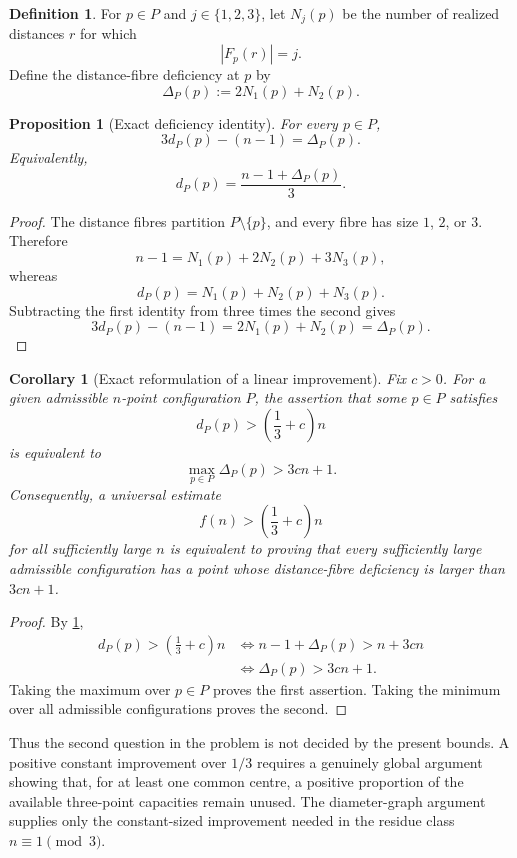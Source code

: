 \documentclass[11pt]{article}
\newtheorem{proposition}[proposition]{Proposition}
\newtheorem{corollary}[corollary]{Corollary}
\theoremstyle{definition}
\newtheorem{definition}[definition]{Definition}
\theoremstyle{remark}
\begin{document}
\begin{definition}
For $p\in P$ and $j\in\{1,2,3\}$, let $N_j(p)$ be the number of realized distances $r$ for which
\[
 |F_p(r)|=j.
\]
Define the distance-fibre deficiency at $p$ by
\[
 \Delta_P(p):=2N_1(p)+N_2(p).
\]
\end{definition}

\begin{proposition}[Exact deficiency identity]\label{prop:deficiency}
For every $p\in P$,
\[
 \boxed{
 3d_P(p)-(n-1)=\Delta_P(p).}
\]
Equivalently,
\[
 d_P(p)=\frac{n-1+\Delta_P(p)}{3}.
\]
\end{proposition}

\begin{proof}
The distance fibres partition $P\setminus\{p\}$, and every fibre has size $1$, $2$, or $3$.  Therefore
\[
 n-1=N_1(p)+2N_2(p)+3N_3(p),
\]
whereas
\[
 d_P(p)=N_1(p)+N_2(p)+N_3(p).
\]
Subtracting the first identity from three times the second gives
\[
 3d_P(p)-(n-1)=2N_1(p)+N_2(p)=\Delta_P(p).
\]
\end{proof}

\begin{corollary}[Exact reformulation of a linear improvement]\label{cor:reformulation}
Fix $c>0$.  For a given admissible $n$-point configuration $P$, the assertion that some $p\in P$ satisfies
\[
 d_P(p)>\left(\frac13+c\right)n
\]
is equivalent to
\[
 \max_{p\in P}\Delta_P(p)>3cn+1.
\]
Consequently, a universal estimate
\[
 f(n)>\left(\frac13+c\right)n
\]
for all sufficiently large $n$ is equivalent to proving that every sufficiently large admissible configuration has a point whose distance-fibre deficiency is larger than $3cn+1$.
\end{corollary}

\begin{proof}
By \cref{prop:deficiency},
\begin{align*}
 d_P(p)>\left(\frac13+c\right)n
 &\iff n-1+\Delta_P(p)>n+3cn\\
 &\iff \Delta_P(p)>3cn+1.
\end{align*}
Taking the maximum over $p\in P$ proves the first assertion.  Taking the minimum over all admissible configurations proves the second.
\end{proof}

Thus the second question in the problem is not decided by the present bounds.  A positive constant improvement over $1/3$ requires a genuinely global argument showing that, for at least one common centre, a positive proportion of the available three-point capacities remain unused.  The diameter-graph argument supplies only the constant-sized improvement needed in the residue class $n\equiv1\pmod3$.
\end{document}
